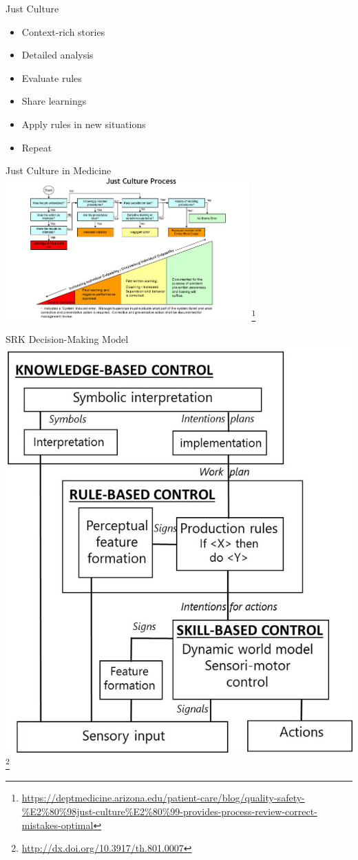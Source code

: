 \documentclass[aspectratio=169,notes]{beamer}
\begin{document}
\begin{frame}{Just Culture}
    \begin{itemize}
        \item Context-rich stories
        \item Detailed analysis
        \item Evaluate rules
        \item Share learnings
        \item Apply rules in new situations
        \item Repeat
    \end{itemize}
\end{frame}
\begin{frame}{Just Culture in Medicine}
    \centering
    \includegraphics[width=0.7\textwidth]{just_culture_UA.jpg} \footnote{\url{https://deptmedicine.arizona.edu/patient-care/blog/quality-safety-\%E2\%80\%98just-culture\%E2\%80\%99-provides-process-review-correct-mistakes-optimal}}
\end{frame}
\begin{frame}{SRK Decision-Making Model}
    \centering
    \includegraphics[height=0.75\textheight]{Rasmussen1989_SRK_model.jpg} \footnote{\url{http://dx.doi.org/10.3917/th.801.0007}}
\end{frame}
\end{document}
